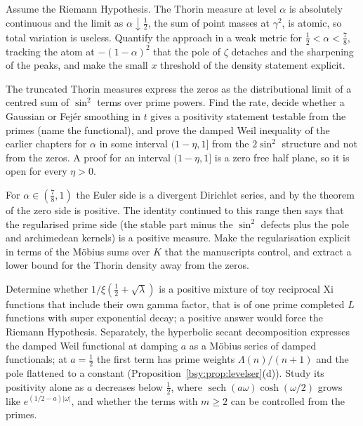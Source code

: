 \begin{problem}\label{qrh:prob:weak}
Assume the Riemann Hypothesis. The Thorin measure at level $\alpha$ is absolutely continuous and the limit as $\alpha\downarrow\frac12$, the sum of point masses at $\gamma^2$, is atomic, so total variation is useless. Quantify the approach in a weak metric for $\frac12<\alpha<\frac78$, tracking the atom at $-(1-\alpha)^2$ that the pole of $\zeta$ detaches and the sharpening of the peaks, and make the small $x$ threshold of the density statement explicit.
\end{problem}

\begin{problem}\label{qrh:prob:trunc}
The truncated Thorin measures express the zeros as the distributional limit of a centred sum of $\sin^2$ terms over prime powers. Find the rate, decide whether a Gaussian or Fej\'er smoothing in $t$ gives a positivity statement testable from the primes (name the functional), and prove the damped Weil inequality of the earlier chapters for $\alpha$ in some interval $(1-\eta,1]$ from the $2\sin^2$ structure and not from the zeros. A proof for an interval $(1-\eta,1]$ is a zero free half plane, so it is open for every $\eta>0$.
\end{problem}

\begin{problem}\label{qrh:prob:reg}
For $\alpha\in(\frac78,1)$ the Euler side is a divergent Dirichlet series, and by the theorem of \cite{OAI26a} the zero side is positive. The identity continued to this range then says that the regularised prime side (the stable part minus the $\sin^2$ defects plus the pole and archimedean kernels) is a positive measure. Make the regularisation explicit in terms of the M\"obius sums over $K$ that the manuscripts control, and extract a lower bound for the Thorin density away from the zeros.
\end{problem}

\begin{problem}\label{qrh:prob:mixture}
Determine whether $1/\xi(\frac12+\sqrt\lambda)$ is a positive mixture of toy reciprocal Xi functions that include their own gamma factor, that is of one prime completed $L$ functions with super exponential decay; a positive answer would force the Riemann Hypothesis. Separately, the hyperbolic secant decomposition expresses the damped Weil functional at damping $a$ as a M\"obius series of damped functionals; at $a=\frac12$ the first term has prime weights $\Lambda(n)/(n+1)$ and the pole flattened to a constant (Proposition~\ref{bsy:prop:levelser}(d)). Study its positivity alone as $a$ decreases below $\frac12$, where $\operatorname{sech}(a\omega)\cosh(\omega/2)$ grows like $e^{(1/2-a)|\omega|}$, and whether the terms with $m\ge2$ can be controlled from the primes.
\end{problem}


